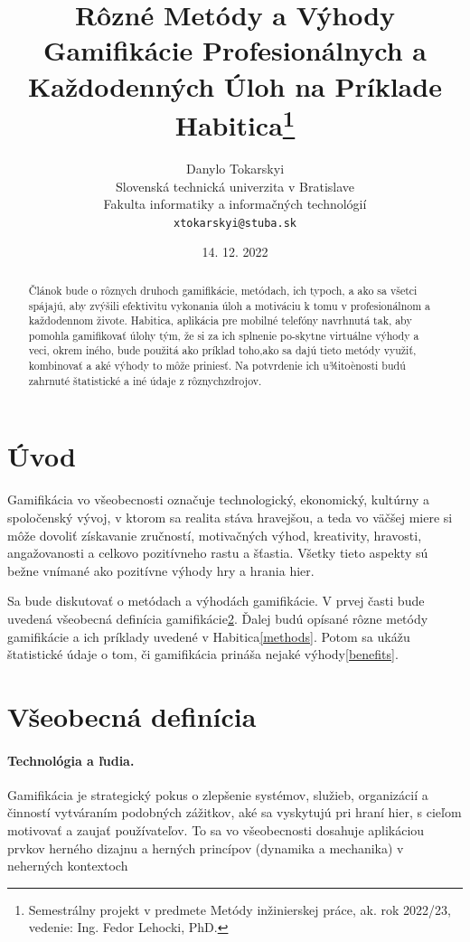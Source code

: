 \documentclass[10pt,twoside,slovak,a4paper]{article}
\title{Rôzné Metódy a Výhody Gamifikácie Profesionálnych a Každodenných Úloh na Príklade Habitica\thanks{Semestrálny 
projekt v predmete Metódy inžinierskej práce, ak. rok 2022/23, vedenie: Ing. Fedor Lehocki, PhD.}}
\author{Danylo Tokarskyi\\[2pt]
	{\small Slovenská technická univerzita v Bratislave}\\
	{\small Fakulta informatiky a informačných technológií}\\
	{\small \texttt{xtokarskyi@stuba.sk}}
	}
\date{\small 14. 12. 2022 } %
\begin{document}
\maketitle

\begin{abstract}
	Článok bude o rôznych druhoch gamifikácie, metódach, ich typoch, a ako sa všetci spájajú, aby zvýšili efektivitu 
	vykonania úloh a motiváciu k tomu v profesionálnom a každodennom živote. Habitica, aplikácia pre mobilné telefóny 
	navrhnutá tak, aby pomohla gamifikovať úlohy tým, že si za ich splnenie po-skytne virtuálne výhody a veci, okrem 
	iného, bude použitá ako príklad toho,ako sa dajú tieto metódy využiť, kombinovať a aké výhody to môže priniesť.
	Na potvrdenie ich u¾itoènosti budú zahrnuté štatistické a iné údaje z rôznychzdrojov.
\end{abstract}



\section{Úvod}

Gamifikácia vo všeobecnosti označuje technologický, ekonomický, kultúrny a spoločenský vývoj, v 
ktorom sa realita stáva hravejšou, a teda vo väčšej miere si môže dovoliť získavanie zručností, 
motivačných výhod, kreativity, hravosti, angažovanosti a celkovo pozitívneho rastu a šťastia. 
Všetky tieto aspekty sú bežne vnímané ako pozitívne výhody hry a hrania hier.\cite{Gamification}

Sa bude diskutovať o metódach a výhodách gamifikácie. 
V prvej časti bude 
uvedená všeobecná definícia 
gamifikácie\ref{definition}. Ďalej budú opísané rôzne metódy gamifikácie 
a ich príklady uvedené v Habitica\ref{methods}. 
Potom sa ukážu štatistické údaje o tom, či gamifikácia 
prináša nejaké výhody\ref{benefits}.




\section{Všeobecná definícia} \label{definition}

\paragraph{Technológia a ľudia.} Gamifikácia je strategický pokus o zlepšenie systémov, služieb, 
organizácií a činností vytváraním podobných zážitkov, 
aké sa vyskytujú pri hraní hier, s cieľom motivovať a zaujať používateľov\cite{Gamification}. 
To sa vo všeobecnosti dosahuje aplikáciou prvkov herného dizajnu a herných princípov 
(dynamika a mechanika) v neherných kontextoch\cite{Defining}
\end{document}
